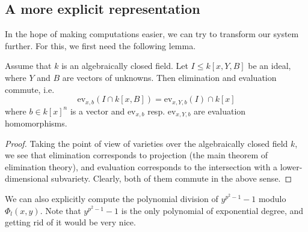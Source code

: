 \subsection{A more explicit representation}
In the hope of making computations easier, we can try to transform our system further.
For this, we first need the following lemma.
\begin{lemma}
    Assume that $k$ is an algebraically closed field.
    Let $I \leq k[x, Y, B]$ be an ideal, where $Y$ and $B$ are vectors of unknowns.
    Then elimination and evaluation commute, i.e.
    \begin{equation*}
        \mathrm{ev}_{x, b}(I \cap k[x, B]) = \mathrm{ev}_{x, Y, b}(I) \cap k[x]
    \end{equation*}
    where $b \in k[x]^n$ is a vector and $\mathrm{ev}_{x, b}$ resp. $\mathrm{ev}_{x, Y, b}$ are evaluation homomorphisms.
\end{lemma}
\begin{proof}
    Taking the point of view of varieties over the algebraically closed field $k$, we see that elimination corresponds to projection (the main theorem of elimination theory), and evaluation corresponds to the intersection with a lower-dimensional subvariety.
    Clearly, both of them commute in the above sense.
\end{proof}
We can also explicitly compute the polynomial division of $y^{p^2 - 1} - 1$ modulo $\Phi_l(x, y)$.
Note that $y^{p^2 - 1} - 1$ is the only polynomial of exponential degree, and getting rid of it would be very nice.
